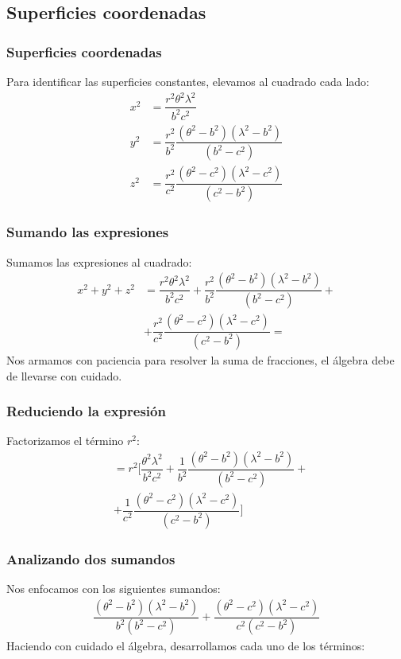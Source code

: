 \documentclass[12pt]{beamer}
\begin{document}
\subsection{Superficies coordenadas}

\begin{frame}
\frametitle{Superficies coordenadas}
Para identificar las superficies constantes, elevamos al cuadrado cada lado:
\pause
\begin{align*}
x^{2} &= \dfrac{r^{2} \theta^{2} \lambda^{2}}{b^{2} c^{2}} \\[0.5em]
y^{2} &= \dfrac{r^{2}}{b^{2}} \dfrac{(\theta^{2} - b^{2})(\lambda^{2} - b^{2})}{(b^{2} - c^{2})} \\[0.5em]
z^{2} &= \dfrac{r^{2}}{c^{2}} \dfrac{(\theta^{2} - c^{2})(\lambda^{2} - c^{2})}{(c^{2} - b^{2})}
\end{align*}
\end{frame}
\begin{frame}
\frametitle{Sumando las expresiones}
Sumamos las expresiones al cuadrado:
\begin{align*}
x^{2} + y^{2} + z^{2} &= \dfrac{r^{2} \theta^{2} \lambda^{2}}{b^{2} c^{2}} + \dfrac{r^{2}}{b^{2}} \dfrac{(\theta^{2} - b^{2})(\lambda^{2} - b^{2})}{(b^{2} - c^{2})} + \\[0.5em]
&+ \dfrac{r^{2}}{c^{2}} \dfrac{(\theta^{2} - c^{2})(\lambda^{2} - c^{2})}{(c^{2} - b^{2})} =
\end{align*}
\pause
Nos armamos con paciencia para resolver la suma de fracciones, el álgebra debe de llevarse con cuidado.
\end{frame}
\begin{frame}
\frametitle{Reduciendo la expresión}
Factorizamos el término $r^{2}$:
\pause
\begin{align*}
&= r^{2} \bigg[ \dfrac{\theta^{2} \lambda^{2}}{b^{2} c^{2}} + \dfrac{1}{b^{2}} \dfrac{(\theta^{2} - b^{2})(\lambda^{2} - b^{2})}{(b^{2} - c^{2})} + \\[0.5em]
&+ \dfrac{1}{c^{2}} \dfrac{(\theta^{2} - c^{2})(\lambda^{2} - c^{2})}{(c^{2} - b^{2})} \bigg]
\end{align*}
\end{frame}
\begin{frame}
\frametitle{Analizando dos sumandos}
Nos enfocamos con los siguientes sumandos:
\pause
\begin{align*}
\dfrac{(\theta^{2} - b^{2})(\lambda^{2} - b^{2})}{b^{2}(b^{2} - c^{2})} + \dfrac{(\theta^{2} - c^{2})(\lambda^{2} - c^{2})}{c^{2}(c^{2} - b^{2})}
\end{align*}
\pause
Haciendo con cuidado el álgebra, desarrollamos cada uno de los términos:
\end{frame}
\end{document}
